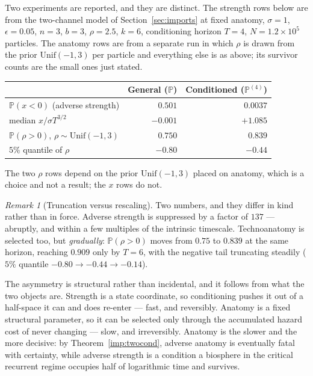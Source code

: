 \documentclass[11pt]{article}
\newcommand{\PP}{\mathbb{P}}
\theoremstyle{plain}
\theoremstyle{definition}
\theoremstyle{remark}
\newtheorem{remark}[theorem]{Remark}
\begin{document}
Two experiments are reported, and they are distinct. The strength rows
below are from the two-channel model of Section~\ref{sec:imports} at fixed
anatomy, $\sigma=1$, $\epsilon=0.05$, $n=3$, $b=3$, $\rho=2.5$, $k=6$,
conditioning horizon $T=4$, $N=1.2\times10^{5}$ particles. The anatomy
rows are from a separate run in which $\rho$ is drawn from the prior
$\mathrm{Unif}(-1,3)$ per particle and everything else is as above; its
survivor counts are the small ones just stated.

\begin{center}\small
\begin{tabular}{@{}lrr@{}}
\toprule
& General ($\PP$) & Conditioned ($\PP^{(4)}$)\\
\midrule
$\PP(x<0)$ (adverse strength) & $0.501$ & $0.0037$\\
median $x/\sigma T^{3/2}$ & $-0.001$ & $+1.085$\\
$\PP(\rho>0)$, $\rho\sim\mathrm{Unif}(-1,3)$ & $0.750$ & $0.839$\\
$5\%$ quantile of $\rho$ & $-0.80$ & $-0.44$\\
\bottomrule
\end{tabular}
\end{center}

\noindent The two $\rho$ rows depend on the prior $\mathrm{Unif}(-1,3)$
placed on anatomy, which is a choice and not a result; the $x$ rows do
not.

\begin{remark}[Truncation versus rescaling]\label{gr:rem:truncresc}
Two numbers, and they differ in kind rather than in force.
Adverse strength is suppressed by a factor of $137$ --- abruptly, and
within a few multiples of the intrinsic timescale. Technoanatomy is
selected too, but \emph{gradually}: $\PP(\rho>0)$ moves from $0.75$ to
$0.839$ at the same horizon, reaching $0.909$ only by $T=6$, with the
negative tail truncating steadily ($5\%$ quantile $-0.80\to-0.44\to
-0.14$).

The asymmetry is structural rather than incidental, and it follows from
what the two objects are. Strength is a state coordinate, so
conditioning pushes it out of a half-space it can and does re-enter ---
fast, and reversibly. Anatomy is a fixed structural parameter, so it can
be selected only through the accumulated hazard cost of never changing
--- slow, and irreversibly. Anatomy is the slower and the more decisive:
by Theorem~\ref{imp:twocond}, adverse anatomy is eventually fatal
with certainty, while adverse strength is a condition a biosphere in the critical
recurrent regime occupies half of logarithmic time and survives.

\end{remark}
\end{document}
